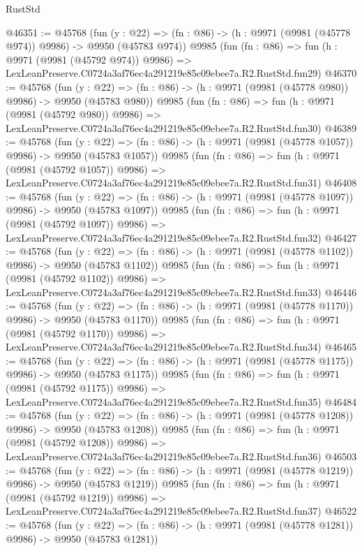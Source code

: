 \begin{lexlean}{RustStd}
\begin{coremodule}
@46351 := @45768
    (fun (y : @22) => (fn : @86) -> (h : @9971 (@9981 (@45778 @974)) @9986) -> @9950 (@45783 @974))
    @9985
    (fun (fn : @86) =>
    fun (h : @9971 (@9981 (@45792 @974)) @9986) =>
    LexLeanPreserve.C0724a3af76ec4a291219e85c09ebee7a.R2.RustStd.fun29)
@46370 := @45768
    (fun (y : @22) => (fn : @86) -> (h : @9971 (@9981 (@45778 @980)) @9986) -> @9950 (@45783 @980))
    @9985
    (fun (fn : @86) =>
    fun (h : @9971 (@9981 (@45792 @980)) @9986) =>
    LexLeanPreserve.C0724a3af76ec4a291219e85c09ebee7a.R2.RustStd.fun30)
@46389 := @45768
    (fun (y : @22) =>
    (fn : @86) -> (h : @9971 (@9981 (@45778 @1057)) @9986) -> @9950 (@45783 @1057))
    @9985
    (fun (fn : @86) =>
    fun (h : @9971 (@9981 (@45792 @1057)) @9986) =>
    LexLeanPreserve.C0724a3af76ec4a291219e85c09ebee7a.R2.RustStd.fun31)
@46408 := @45768
    (fun (y : @22) =>
    (fn : @86) -> (h : @9971 (@9981 (@45778 @1097)) @9986) -> @9950 (@45783 @1097))
    @9985
    (fun (fn : @86) =>
    fun (h : @9971 (@9981 (@45792 @1097)) @9986) =>
    LexLeanPreserve.C0724a3af76ec4a291219e85c09ebee7a.R2.RustStd.fun32)
@46427 := @45768
    (fun (y : @22) =>
    (fn : @86) -> (h : @9971 (@9981 (@45778 @1102)) @9986) -> @9950 (@45783 @1102))
    @9985
    (fun (fn : @86) =>
    fun (h : @9971 (@9981 (@45792 @1102)) @9986) =>
    LexLeanPreserve.C0724a3af76ec4a291219e85c09ebee7a.R2.RustStd.fun33)
@46446 := @45768
    (fun (y : @22) =>
    (fn : @86) -> (h : @9971 (@9981 (@45778 @1170)) @9986) -> @9950 (@45783 @1170))
    @9985
    (fun (fn : @86) =>
    fun (h : @9971 (@9981 (@45792 @1170)) @9986) =>
    LexLeanPreserve.C0724a3af76ec4a291219e85c09ebee7a.R2.RustStd.fun34)
@46465 := @45768
    (fun (y : @22) =>
    (fn : @86) -> (h : @9971 (@9981 (@45778 @1175)) @9986) -> @9950 (@45783 @1175))
    @9985
    (fun (fn : @86) =>
    fun (h : @9971 (@9981 (@45792 @1175)) @9986) =>
    LexLeanPreserve.C0724a3af76ec4a291219e85c09ebee7a.R2.RustStd.fun35)
@46484 := @45768
    (fun (y : @22) =>
    (fn : @86) -> (h : @9971 (@9981 (@45778 @1208)) @9986) -> @9950 (@45783 @1208))
    @9985
    (fun (fn : @86) =>
    fun (h : @9971 (@9981 (@45792 @1208)) @9986) =>
    LexLeanPreserve.C0724a3af76ec4a291219e85c09ebee7a.R2.RustStd.fun36)
@46503 := @45768
    (fun (y : @22) =>
    (fn : @86) -> (h : @9971 (@9981 (@45778 @1219)) @9986) -> @9950 (@45783 @1219))
    @9985
    (fun (fn : @86) =>
    fun (h : @9971 (@9981 (@45792 @1219)) @9986) =>
    LexLeanPreserve.C0724a3af76ec4a291219e85c09ebee7a.R2.RustStd.fun37)
@46522 := @45768
    (fun (y : @22) =>
    (fn : @86) -> (h : @9971 (@9981 (@45778 @1281)) @9986) -> @9950 (@45783 @1281))

\end{coremodule}
\end{lexlean}
